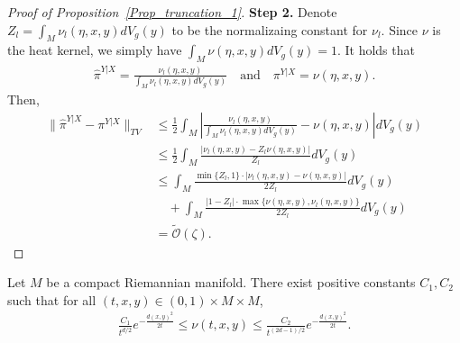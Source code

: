 \begin{proof}[Proof of Proposition~\ref{Prop_truncation_1}]
    \textbf{Step 2.}    Denote $Z_{l} = \int_{M} \nu_{l}(\eta, x, y) dV_{g}(y)$ to be the normalizaing constant for $\nu_{l}$.
    Since $\nu$ is the heat kernel, we simply have $\int_{M} \nu(\eta, x, y) dV_{g}(y) = 1$. 
    It holds that 
    \begin{align*}
        \hat{\pi}^{Y|X} = \frac{\nu_{l}(\eta, x, y)}{\int_{M} \nu_{l}(\eta, x, y) dV_{g}(y) }\quad\text{and}\quad \pi^{Y|X} = \nu(\eta, x, y).
    \end{align*}
    Then,
    \begin{align*}
            \|\hat{\pi}^{Y|X} - \pi^{Y|X}\|_{TV}
        &\le \frac{1}{2} \int_{M} | \frac{\nu_{l}(\eta, x, y)}{\int_{M} \nu_{l}(\eta, x, y) dV_{g}(y) } 
        - \nu(\eta, x, y)| dV_{g}(y) \\
        &\le \frac{1}{2} \int_{M} \frac{| \nu_{l}(\eta, x, y) - Z_{l} \nu(\eta, x, y)|}{Z_{l}} dV_{g}(y)\\
        &\le \int_{M} \frac{\min\{Z_{l}, 1\} \cdot | \nu_{l}(\eta, x, y) -  \nu(\eta, x, y)| }{2Z_{l}} dV_{g}(y) \\
        &\quad + \int_{M} \frac{|1 - Z_{l}| \cdot \max\{ \nu(\eta, x, y), \nu_{l}(\eta, x, y)\}}{2Z_{l}} dV_{g}(y)\\
        &= \tilde{\mathcal{O}}(\zeta).
    \end{align*}
\end{proof}

\begin{theorem}\label{Thm534_Hsu} Let $M$ be a compact Riemannian manifold. There exist positive constants $C_{1}, C_{2}$ 
    such that for all $(t, x, y) \in (0, 1) \times M \times M$, 
    \begin{align*}
        \frac{C_{1}}{t^{d/2}} e^{-\frac{d(x, y)^{2}}{2t}} \le \nu(t, x, y) \le \frac{C_{2}}{t^{(2d-1)/2}} e^{-\frac{d(x, y)^{2}}{2t}}.
    \end{align*}
\end{theorem}

